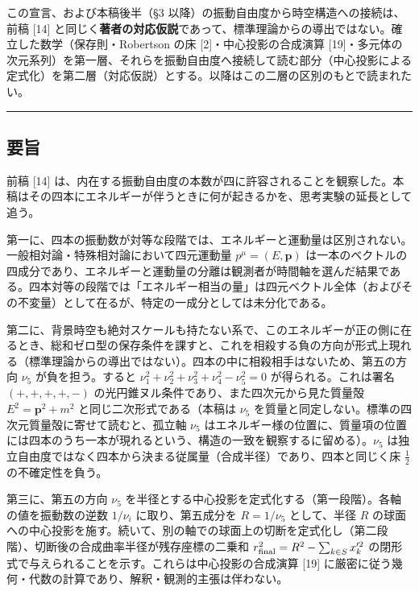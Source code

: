 \documentclass[
]{ltjsarticle}
\begin{document}
この宣言、および本稿後半（§3
以降）の振動自由度から時空構造への接続は、前稿 {[}14{]}
と同じく\textbf{著者の対応仮説}であって、標準理論からの導出ではない。確立した数学（保存則・Robertson
の床 {[}2{]}・中心投影の合成演算
{[}19{]}・多元体の次元系列）を第一層、それらを振動自由度へ接続して読む部分（中心投影による定式化）を第二層（対応仮説）とする。以降はこの二層の区別のもとで読まれたい。

\begin{center}\rule{0.5\linewidth}{0.5pt}\end{center}

\subsection{要旨}\label{ux8981ux65e8}

前稿 {[}14{]}
は、内在する振動自由度の本数が四に許容されることを観察した。本稿はその四本にエネルギーが伴うときに何が起きるかを、思考実験の延長として追う。

第一に、四本の振動数が対等な段階では、エネルギーと運動量は区別されない。一般相対論・特殊相対論において四元運動量
\(p^\mu=(E,\boldsymbol{p})\)
は一本のベクトルの四成分であり、エネルギーと運動量の分離は観測者が時間軸を選んだ結果である。四本対等の段階では「エネルギー相当の量」は四元ベクトル全体（およびその不変量）として在るが、特定の一成分としては未分化である。

第二に、背景時空も絶対スケールも持たない系で、このエネルギーが正の側に在るとき、総和ゼロ型の保存条件を課すと、これを相殺する負の方向が形式上現れる（標準理論からの導出ではない）。四本の中に相殺相手はないため、第五の方向
\(\nu_5\) が負を担う。すると
\(\nu_1^2+\nu_2^2+\nu_3^2+\nu_4^2-\nu_5^2=0\) が得られる。これは署名
\((+,+,+,+,-)\) の光円錐ヌル条件であり、また四次元から見た質量殻
\(E^2=\boldsymbol{p}^2+m^2\) と同じ二次形式である（本稿は \(\nu_5\)
を質量と同定しない。標準の四次元質量殻に寄せて読むと、孤立軸 \(\nu_5\)
はエネルギー様の位置に、質量項の位置には四本のうち一本が現れるという、構造の一致を観察するに留める）。\(\nu_5\)
は独立自由度ではなく四本から決まる従属量（合成半径）であり、四本と同じく床
\(\tfrac12\) の不確定性を負う。

第三に、第五の方向 \(\nu_5\)
を半径とする中心投影を定式化する（第一段階）。各軸の値を振動数の逆数
\(1/\nu_i\) に取り、第五成分を \(R=1/\nu_5\) として、半径 \(R\)
の球面への中心投影を施す。続いて、別の軸での球面上の切断を定式化し（第二段階）、切断後の合成曲率半径が残存座標の二乗和
\(r_{\rm final}^2=R^2-\sum_{k\in S}x_k'^2\)
の閉形式で与えられることを示す。これらは中心投影の合成演算 {[}19{]}
に厳密に従う幾何・代数の計算であり、解釈・観測的主張は伴わない。
\end{document}
